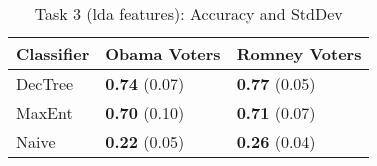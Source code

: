 \begin{table}[H]
\begin{centering}
\begin{tabular}{ l | l | l }
Classifier & Obama Voters & Romney Voters \\
\hline
DecTree & \textbf{0.74} (0.07) &  \textbf{0.77} (0.05) \\
MaxEnt & \textbf{0.70} (0.10) &  \textbf{0.71} (0.07) \\
Naive & \textbf{0.22} (0.05) &  \textbf{0.26} (0.04) \\
\end{tabular}
\caption{Task 3 (lda features): Accuracy and StdDev}
\label{tab:task3lda}
\end{centering}
\end{table}


